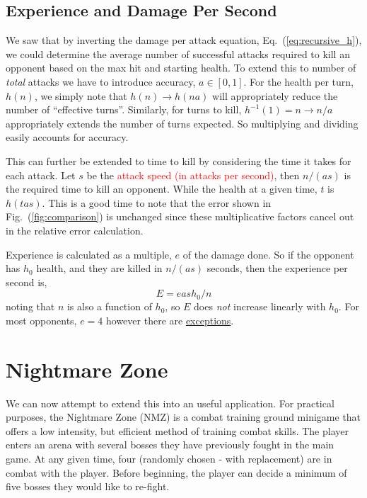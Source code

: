\documentclass[../../main.tex]{subfiles}
\begin{document}
		\subsection{Experience and Damage Per Second}
			We saw that by inverting the damage per attack equation, Eq.~(\ref{eq:recursive_h}), we could determine the average number of successful attacks required to kill an opponent based on the max hit and starting health. To extend this to number of \textit{total} attacks we have to introduce accuracy, $a\in[0, 1]$. For the health per turn, $h(n)$, we simply note that $h(n)\to h(na)$ will appropriately reduce the number of ``effective turns''. Similarly, for turns to kill, $h^{-1}(1)=n\to n/a$ appropriately extends the number of turns expected. So multiplying and dividing easily accounts for accuracy. 

			This can further be extended to time to kill by considering the time it takes for each attack. Let $s$ be the \textcolor{red}{attack speed (in attacks per second)}, then $n/(as)$ is the required time to kill an opponent. While the health at a given time, $t$ is $h(tas)$. This is a good time to note that the error shown in Fig.~(\ref{fig:comparison}) is unchanged since these multiplicative factors cancel out in the relative error calculation.

			Experience is calculated as a multiple, $e$ of the damage done. So if the opponent has $h_0$ health, and they are killed in $n/(as)$ seconds, then the experience per second is,
			\begin{equation}
				\boxed{E=eash_0/n}
			\end{equation}
			noting that $n$ is also a function of $h_0$, so $E$ does \emph{not} increase linearly with $h_0$. For most opponents, $e=4$ however there are \href{https://twitter.com/BitterkoekjeRS/status/803960032178110468}{exceptions}.

	\section{Nightmare Zone}
		We can now attempt to extend this into an useful application. For practical purposes, the Nightmare Zone (NMZ) is a combat training ground minigame that offers a low intensity, but efficient method of training combat skills. The player enters an arena with several bosses they have previously fought in the main game. At any given time, four (randomly chosen - with replacement) are in combat with the player. Before beginning, the player can decide a minimum of five bosses they would like to re-fight.
\end{document}
